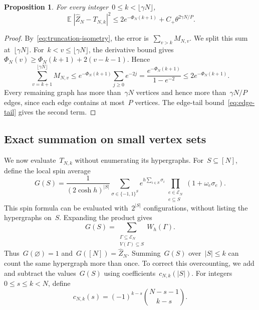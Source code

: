 \documentclass[letterpaper,11pt,reqno]{amsart}
\renewcommand{\leq}{\leqslant}
\renewcommand{\geq}{\geqslant}
\DeclareMathOperator{\E}{\mathds{E}}
\newtheorem{proposition}[theorem]{Proposition}
\begin{document}
\begin{proposition}\label{prop:higher-truncation}
For every integer~$0\leq k<\lfloor\gamma N\rfloor$,
\begin{equation}\label{eq:higher-truncation}
\E|\widehat Z_N-T_{N,k}|^2\leq2e^{-\Phi_N(k+1)}+C_+\theta^{2\gamma N/P}.
\end{equation}
\end{proposition}
\begin{proof}
By~\eqref{eq:truncation-isometry}, the error is~$\sum_{v>k}M_{N,v}$. We split this sum at~$\lfloor\gamma N\rfloor$. For~$k<v\leq\lfloor\gamma N\rfloor$, the derivative bound gives~$\Phi_N(v)\geq\Phi_N(k+1)+2(v-k-1)$. Hence
\begin{equation*}
\sum_{v=k+1}^{\lfloor\gamma N\rfloor}M_{N,v}
\leq e^{-\Phi_N(k+1)}\sum_{j\geq0}e^{-2j}
=\frac{e^{-\Phi_N(k+1)}}{1-e^{-2}}
\leq2e^{-\Phi_N(k+1)}.
\end{equation*}
Every remaining graph has more than~$\gamma N$ vertices and hence more than~$\gamma N/P$ edges, since each edge contains at most~$P$ vertices. The edge-tail bound~\eqref{eq:edge-tail} gives the second term.
\end{proof}

\subsection{Exact summation on small vertex sets}\label{subsec:pure-evaluation}

We now evaluate~$T_{N,k}$ without enumerating its hypergraphs. For~$S\subseteq[N]$, define the local spin average
\begin{equation}\label{eq:local-spin-average}
G(S)=\frac{1}{(2\cosh h)^{|S|}}\sum_{\sigma\in\{-1,1\}^{S}}e^{h\sum_{i\in S}\sigma_i}
\prod_{\substack{e\in\mathcal E_N\\e\subseteq S}}(1+\omega_e\sigma_e).
\end{equation}
 This spin formula can be evaluated with~$2^{|S|}$ configurations, without listing the hypergraphs on~$S$. Expanding the product gives
\begin{equation*}
G(S)=\sum_{\substack{\Gamma\subseteq\mathcal E_N\\V(\Gamma)\subseteq S}}W_h(\Gamma).
\end{equation*}
Thus~$G(\varnothing)=1$ and~$G([N])=\widehat Z_N$. Summing~$G(S)$ over~$|S|\leq k$ can count the same hypergraph more than once. To correct this overcounting, we add and subtract the values~$G(S)$ using coefficients~$c_{N,k}(|S|)$. For integers~$0\leq s\leq k<N$, define
\begin{equation}\label{eq:exact-support-weight}
c_{N,k}(s)=(-1)^{k-s}\binom{N-s-1}{k-s}.
\end{equation}
\end{document}
